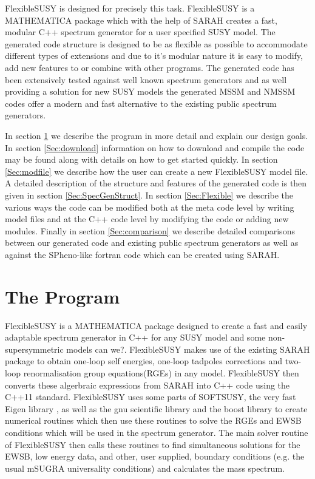 \documentclass[final,3p,times,pdflatex]{elsarticle}
\newcommand{\sarah}{SARAH\xspace}
\newcommand{\fs}{FlexibleSUSY\xspace}
\begin{document}
\fs is designed for precisely this task. \fs is a MATHEMATICA package
which with the help of \sarah
\cite{Staub:2010ty,Staub:2009bi,Staub:2010jh,Staub:2012pb,Staub:2013tta}
creates a fast, modular C++ spectrum generator for a user specified
SUSY model.  The generated code structure is designed to be as
flexible as possible to accommodate different types of extensions and
due to it's modular nature it is easy to modify, add new features to
or combine with other programs.  The generated code has been
extensively tested against well known spectrum generators and as well
providing a solution for new SUSY models the generated MSSM and NMSSM
codes offer a modern and fast alternative to the existing public
spectrum generators.

In section \ref{Sec:Program} we describe the program in more detail
and explain our design goals.  In section \ref{Sec:download}
information on how to download and compile the code may be found along
with details on how to get started quickly.  In section
\ref{Sec:modfile} we describe how the user can create a new
FlexibleSUSY model file. A detailed description of the structure and
features of the generated code is then given in section
\ref{Sec:SpecGenStruct}.  In section \ref{Sec:Flexible} we describe
the various ways the code can be modified both at the meta code level
by writing model files and at the C++ code level by modifying the code
or adding new modules. Finally in section \ref{Sec:comparison} we
describe detailed comparisons between our generated code and existing
public spectrum generators as well as against the SPheno-like fortran
code which can be created using SARAH.


\section{The Program}
\label{Sec:Program}
\fs is a MATHEMATICA package designed to create a fast and easily
adaptable spectrum generator in C++ for any SUSY model and some
non-supersymmetric models {\color{red} can we?}.  \fs makes use of the
existing \sarah package \cite{Staub:2010ty,Staub:2009bi,Staub:2010jh,Staub:2012pb,Staub:2013tta} to obtain one-loop self energies, one-loop
tadpoles corrections and two-loop renormalisation group
equations(RGEs) in any model.  \fs then converts these algerbraic
expressions from \sarah into C++ code using the C++11 standard. \fs
uses some parts of SOFTSUSY\cite{Allanach:2001kg}, the very fast Eigen
library \cite{eigen}, as well as the gnu scientific library and the
boost library to create numerical routines which then use these
routines to solve the RGEs and EWSB conditions which will be used in
the spectrum generator. The main solver routine of \fs then calls
these routines to find simultaneous solutions for the EWSB, low energy
data, and other, user supplied, boundary conditions (e.g. the usual
mSUGRA universality conditions) and calculates the mass spectrum.
\end{document}
